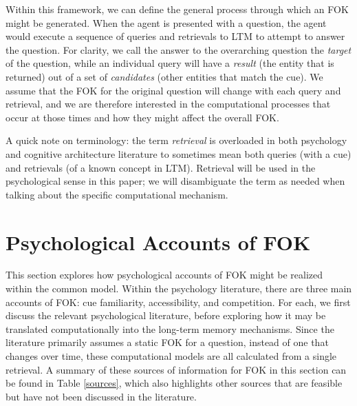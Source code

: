 \documentclass[10pt,letterpaper]{article}
\begin{document}
Within this framework, we can define the general process through which an FOK might be generated.
When the agent is presented with a question, the agent would execute a sequence of queries and retrievals to LTM to attempt to answer the question.
For clarity, we call the answer to the overarching question the \textit{target} of the question, while an individual query will have a \textit{result} (the entity that is returned) out of a set of \textit{candidates} (other entities that match the cue). %
We assume that the FOK for the original question will change with each query and retrieval, and we are therefore interested in the computational processes that occur at those times and how they might affect the overall FOK.

A quick note on terminology: the term \textit{retrieval} is overloaded in both psychology and cognitive architecture literature to sometimes mean both queries (with a cue) and retrievals (of a known concept in LTM).
Retrieval will be used in the psychological sense in this paper; we will disambiguate the term as needed when talking about the specific computational mechanism.


\section{Psychological Accounts of FOK}

This section explores how psychological accounts of FOK might be realized within the common model.
Within the psychology literature, there are three main accounts of FOK: cue familiarity, accessibility, and competition.
For each, we first discuss the relevant psychological literature, before exploring how it may be translated computationally into the long-term memory mechanisms.
Since the literature primarily assumes a static FOK for a question, instead of one that changes over time, these computational models are all calculated from a single retrieval.
A summary of these sources of information for FOK in this section can be found in Table \ref{sources}, which also highlights other sources that are feasible but have not been discussed in the literature.
\end{document}
